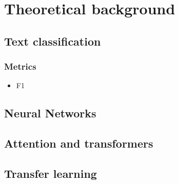 \chapter{Theoretical background}
\section{Text classification}
\subsection{Metrics}
\begin{itemize}
    \item F1 \label{f1}
\end{itemize}
\section{Neural Networks }
\section{Attention and transformers}\label{att_transformers}
\section{Transfer learning}
